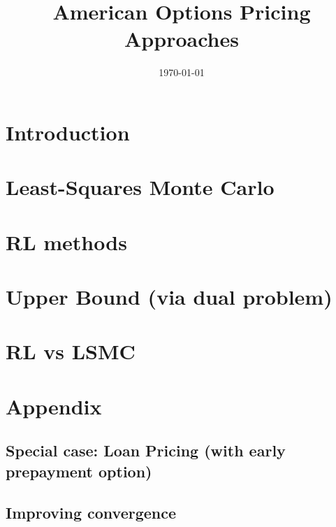 \documentclass[8pt]{article}
\renewcommand{\|}{\ensuremath{\hspace{0.1cm} | \hspace{0.1cm}}}
\begin{document}
    \title{American Options Pricing Approaches}

    \date{\today}

    \maketitle

    

    \tableofcontents

    \section{Introduction}
        

    \section{Least-Squares Monte Carlo \cite{LSMC}}
        

    \section{RL methods}
        

    \section{Upper Bound (via dual problem)}
        


    \section{RL vs LSMC}
        

    \section{Appendix}
        \subsection{Special case: Loan Pricing (with early prepayment option)}
            

        \subsection{Improving convergence}
            

    \nocite{*}
    \printbibliography
\end{document}
